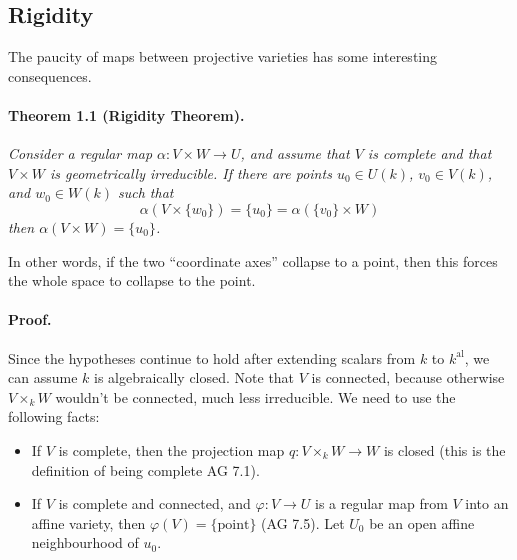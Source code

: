 \subsection*{Rigidity}

The paucity of maps between projective varieties has some interesting
consequences.

\paragraph{Theorem 1.1 (Rigidity Theorem).}
\textit{Consider a regular map $\alpha : V \times W \to U$, and assume that
$V$ is complete and that $V \times W$ is geometrically irreducible. If there
are points $u_0 \in U(k)$, $v_0 \in V(k)$, and $w_0 \in W(k)$ such that}
\[
  \alpha(V \times \{w_0\}) = \{u_0\} = \alpha(\{v_0\} \times W)
\]
\textit{then $\alpha(V \times W) = \{u_0\}$.}

In other words, if the two ``coordinate axes'' collapse to a point, then
this forces the whole space to collapse to the point.

\paragraph{Proof.}
Since the hypotheses continue to hold after extending scalars from $k$ to
$k^{\mathrm{al}}$, we can assume $k$ is algebraically closed. Note that $V$
is connected, because otherwise $V \times_k W$ wouldn't be connected, much
less irreducible. We need to use the following facts:
\begin{itemize}
\item[(i)] If $V$ is complete, then the projection map
  $q : V \times_k W \to W$ is closed (this is the definition of being
  complete AG 7.1).
\item[(ii)] If $V$ is complete and connected, and $\varphi : V \to U$ is a
  regular map from $V$ into an affine variety, then
  $\varphi(V) = \{\text{point}\}$ (AG 7.5). Let $U_0$ be an open affine
  neighbourhood of $u_0$.
\end{itemize}
